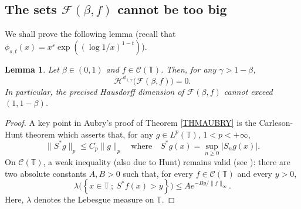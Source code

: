 \documentclass[11pt,a4paper]{amsart}
\theoremstyle{plain}
\newtheorem{lemma}[theorem]{Lemma}
\begin{document}
\subsection{The sets $\mathcal F(\beta,f)$ cannot be too big}
We shall prove the following lemma (recall that $\phi_{s,t}(x)=x^s\exp\left((\log 1/x)^{1-t}\right)$).
\begin{lemma}\label{LEMCTMAJO}
Let $\beta\in(0,1)$ and $f\in\mathcal C({\mathbb T})$. Then, for any $\gamma>1-\beta$, 
$$\mathcal H^{\phi_{1,\gamma}}\big(\mathcal F(\beta,f)\big)=0.$$
In particular, the precised Hausdorff dimension of $\mathcal F(\beta,f)$ cannot exceed $(1,1-\beta)$.
\end{lemma}
\begin{proof}
A key point in Aubry's proof of Theorem \ref{THMAUBRY} is the Carleson-Hunt theorem which asserts that,
for any $g\in L^p({\mathbb T})$, $1<p<+\infty$,
$$\|S^* g\|_{p}\leq C_p\|g\|_{p}\quad\textrm{where}\quad S^*g(x)=\sup_{n\ge 0} |S_ng(x)|.$$
On $\mathcal C({\mathbb T})$, a weak inequality (also due to Hunt) remains valid (see \cite[Theorem 12.5]{Ar02}): there
are two absolute constants $A,B>0$ such that, for every $f\in\mathcal C({\mathbb T})$ and every $y>0$,
$$\mathcal \lambda\big(\left\{x\in{\mathbb T}\ ;\ S^* f(x)>y\right\}\big)\leq Ae^{-By/\|f\|_\infty}.$$
Here, $\lambda$ denotes the Lebesgue measure on ${\mathbb T}$. 


\end{proof}
\end{document}
